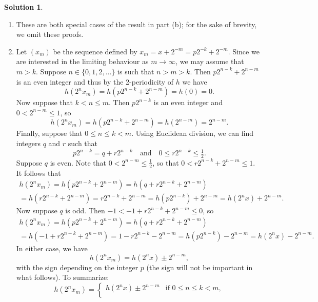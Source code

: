 \documentclass[12pt]{article}
\theoremstyle{definition}
\theoremstyle{exercise}
\theoremstyle{solution}
\newtheorem*{solution}{Solution}
\newcommand{\quand}{\quad \text{and} \quad}
\begin{document}
\begin{solution}
    \begin{enumerate}
        \item These are both special cases of the result in part (b); for the sake of brevity, we omit these proofs.

        \item Let \( (x_m) \) be the sequence defined by \( x_m = x + 2^{-m} = p 2^{-k} + 2^{-m} \). Since we are interested in the limiting behaviour as \( m \to \infty \), we may assume that \( m > k \). Suppose \( n \in \{ 0, 1, 2, \ldots \} \) is such that \( n > m > k \). Then \( p 2^{n - k} + 2^{n - m} \) is an even integer and thus by the 2-periodicity of \( h \) we have
        \[
            h(2^n x_m) = h(p 2^{n - k} + 2^{n - m}) = h(0) = 0.
        \]
        Now suppose that \( k < n \leq m \). Then \( p 2^{n - k} \) is an even integer and \( 0 < 2^{n - m} \leq 1 \), so
        \[
            h(2^n x_m) = h(p 2^{n - k} + 2^{n - m}) = h(2^{n - m}) = 2^{n - m}.
        \]
        Finally, suppose that \( 0 \leq n \leq k < m \). Using Euclidean division, we can find integers \( q \) and \( r \) such that
        \[
            p 2^{n - k} = q + r 2^{n - k} \quand 0 \leq r 2^{n - k} \leq \tfrac{1}{2}.
        \]
        Suppose \( q \) is even. Note that \( 0 < 2^{n - m} \leq \tfrac{1}{2} \), so that \( 0 < r 2^{n - k} + 2^{n - m} \leq 1 \). It follows that
        \begin{multline*}
            h(2^n x_m) = h(p 2^{n - k} + 2^{n - m}) = h(q + r 2^{n - k} + 2^{n - m}) \\ = h(r 2^{n - k} + 2^{n - m}) = r 2^{n - k} + 2^{n - m} = h(p 2^{n - k}) + 2^{n - m} = h(2^n x) + 2^{n - m}.
        \end{multline*}
        Now suppose \( q \) is odd. Then \( -1 < -1 + r 2^{n - k} + 2^{n - m} \leq 0 \), so
        \begin{multline*}
            h(2^n x_m) = h(p 2^{n - k} + 2^{n - m}) = h(q + r 2^{n - k} + 2^{n - m}) \\ = h(-1 + r 2^{n - k} + 2^{n - m}) = 1 - r 2^{n - k} - 2^{n - m} = h(p 2^{n - k}) - 2^{n - m} = h(2^n x) - 2^{n - m}.
        \end{multline*}
        In either case, we have
        \[
            h(2^n x_m) = h(2^n x) \pm 2^{n - m},
        \]
        with the sign depending on the integer \( p \) (the sign will not be important in what follows). To summarize:
        \[
            h(2^n x_m) = \begin{cases}
                h(2^n x) \pm 2^{n - m} & \text{if } 0 \leq n \leq k < m, \\

\end{cases}\]
\end{enumerate}
\end{solution}
\end{document}

